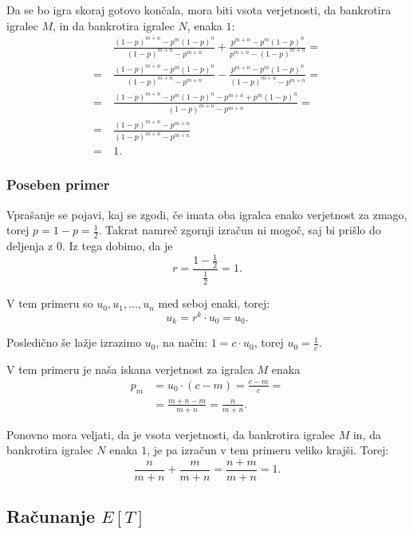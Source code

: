 \documentclass[12pt, a4paper]{article}
\begin{document}
Da se bo igra skoraj gotovo končala, mora biti vsota verjetnosti, da bankrotira igralec $M$, in da bankrotira igralec $N$, enaka $1$:
\begin{equation*}
\begin{split}
&~\frac{(1-p)^{m+n}-p^m (1-p)^n}{(1-p)^{m+n}-p^{m+n}}+\frac{p^{m+n}-p^m
   (1-p)^n}{p^{m+n}-(1-p)^{m+n}} =\\
= &~\frac{(1-p)^{m+n}-p^m (1-p)^n}{(1-p)^{m+n}-p^{m+n}}-\frac{p^{m+n}-p^m
   (1-p)^n}{(1-p)^{m+n}-p^{m+n}} =\\
= &~\frac{(1-p)^{m+n}-p^m (1-p)^n-p^{m+n}+p^m
   (1-p)^n}{(1-p)^{m+n}-p^{m+n}} =\\
= &~\frac{(1-p)^{m+n}-p^{m+n}}{(1-p)^{m+n}-p^{m+n}} \\
= &~1.
\end{split} 
\end{equation*}


\subsubsection{Poseben primer}
\label{Posebni primer za  r = 1}
Vprašanje se pojavi, kaj se zgodi, če imata oba igralca enako verjetnost za zmago, torej $p = 1 - p = \frac{1}{2}$. Takrat namreč zgornji izračun ni mogoč, saj bi prišlo do deljenja z $0$. Iz tega dobimo, da je 
$$r = \frac{1 - \frac{1}{2}}{\frac{1}{2}} = 1.$$

V tem primeru so $u_0, u_1, \dotso, u_n$ med seboj enaki, torej:
$$u_k = r^k \cdot u_0 = u_0.$$

Posledično še lažje izrazimo $u_0$, na način:
$1 = c\cdot u_0$, torej $u_0 = \frac{1}{c}.$

V tem primeru je naša iskana verjetnost za igralca $M$ enaka
\begin{equation*}
\begin{split}
p_m &= u_0 \cdot (c - m) = \frac{c-m}{c} = \\
		&= \frac{m + n - m}{m + n} = \frac{n}{m + n}.
\end{split} 
\end{equation*}

Ponovno mora veljati, da je vsota verjetnosti, da bankrotira igralec $M$ in, da bankrotira igralec $N$ enaka $1$, je pa izračun v tem primeru veliko krajši. Torej: 
$$\frac{n}{m + n} + \frac{m}{m + n} = \frac{n + m}{m+ n} = 1.$$


\subsection{Računanje $E[T]$}
\end{document}
